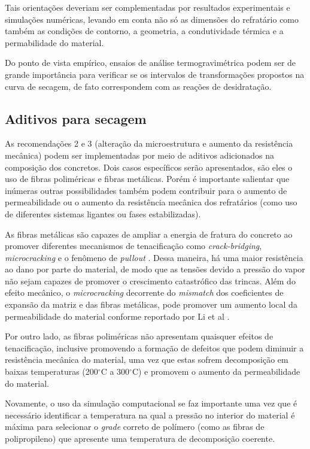 Tais orientações deveriam ser complementadas por resultados experimentais e
simulações numéricas, levando em conta não só as dimensões do refratário como
também as condições de contorno, a geometria, a condutividade térmica e a
permabilidade do material.

Do ponto de vista empírico, ensaios de análise termogravimétrica podem ser de
grande importância para verificar se os intervalos de transformações propostos
na curva de secagem, de fato correspondem com as reações de desidratação.

\subsection{Aditivos para secagem}
As recomendações 2 e 3 (alteração da microestrutura e aumento da resistência
mecânica) podem ser implementadas por meio de aditivos adicionados na composição
dos concretos. Dois casos específicos serão apresentados, são eles o uso de
fibras poliméricas e fibras metálicas. Porém é importante salientar que inúmeras
outras possibilidades também podem contribuir para o aumento de permeabilidade
ou o aumento da resistência mecânica dos refratários (como uso de diferentes
sistemas ligantes ou fases estabilizadas).

As fibras metálicas são capazes de ampliar a energia de fratura do concreto ao
promover diferentes mecanismos de tenacificação como {\it crack-bridging}, {\it
  microcracking} e o fenômeno de {\it pullout} \cite{da2015refractory}. Dessa
maneira, há uma maior resistência ao dano por parte do material, de modo que as
tensões devido a pressão do vapor não sejam capazes de promover o crescimento
catastrófico das trincas. Além do efeito mecânico, o {\it microcracking}
decorrente do {\it mismatch} dos coeficientes de expansão da matriz e das fibras
metálicas, pode promover um aumento local da permeabilidade do material conforme
reportado por Li et al \cite{li2019}.

Por outro lado, as fibras poliméricas não apresentam quaisquer efeitos de
tenacificação, inclusive promovendo a formação de defeitos que podem diminuir a
resistência mecânica do material, uma vez que estas sofrem decomposição em
baixas temperaturas (200$^\circ$C a 300$^\circ$C) e promovem o aumento da
permeabilidade do material.

Novamente, o uso da simulação computacional se faz importante uma vez que é
necessário identificar a temperatura na qual a pressão no interior do material é
máxima para selecionar o {\it grade} correto de polímero (como as fibras de
polipropileno) que apresente uma temperatura de decomposição coerente.

